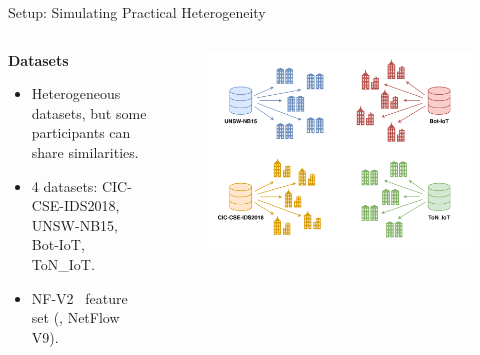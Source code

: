 \begin{frame}{Setup: Simulating Practical Heterogeneity}

    \begin{columns}
      \begin{column}{.4\textwidth}
        \textbf{Datasets}
        \begin{itemize}
          \item Heterogeneous datasets, but some participants can share similarities.
          \item 4 datasets: CIC-CSE-IDS2018, UNSW-NB15, Bot-IoT, ToN\_IoT.
          \item NF-V2~\autocite{sarhan_StandardFeatureSet_2021} feature set (\ie, NetFlow V9).
        \end{itemize}
      \end{column}
      \begin{column}{.56\textwidth}
        \begin{figure}
          \includegraphics[width=\linewidth]{figures/radar/partition.pdf}%
        \end{figure}
      \end{column}
    \end{columns}
  \end{frame}
  
